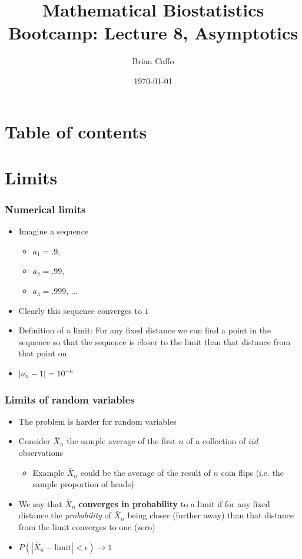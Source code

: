 \documentclass[aspectratio=169]{beamer}
\title{Mathematical Biostatistics Bootcamp: Lecture 8, Asymptotics}
\author{Brian Caffo}
\date{\today}
\institute[Department of Biostatistics]{
  Department of Biostatistics \\
  Johns Hopkins Bloomberg School of Public Health\\
  Johns Hopkins University
}
\begin{document}
\frame{\titlepage}


\section{Table of contents}

\section{Limits}
\begin{frame}\frametitle{Numerical limits}
  \begin{itemize}
  \item Imagine a sequence
    \begin{itemize}
    \item $a_1 = .9$,
    \item $a_2 = .99$,
    \item $a_3 = .999$, $\hdots$
    \end{itemize}
  \item Clearly this sequence converges to $1$
  \item Definition of a limit: For any fixed distance we can find a
    point in the sequence so that the sequence is closer to the limit
    than that distance from that point on
  \item $|a_n - 1| = 10^{-n}$
  \end{itemize}
\end{frame}

\begin{frame}\frametitle{Limits of random variables}
  \begin{itemize}
  \item The problem is harder for random variables
  \item Consider $\bar X_n$ the sample average of the first $n$ of
    a collection of $iid$ observations
    \begin{itemize}
    \item Example $\bar X_n$ could be the average of the result of
      $n$ coin flips (i.e. the sample proportion of heads)
    \end{itemize}
  \item We say that $\bar X_n$ {\bf converges in probability} to a limit
    if for any fixed distance the {\em probability} of $\bar X_n$ being
    closer (further away) than that distance from the limit converges to
    one (zero)
  \item $P(|\bar X_n - \mbox{limit}| < \epsilon) \rightarrow 1$ 
  \end{itemize}
\end{frame}
\end{document}
